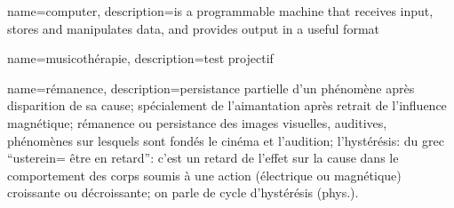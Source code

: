{
  name=computer,
  description={is a programmable machine that receives input,
               stores and manipulates data, and provides
               output in a useful format}
}

{
  name=musicothérapie,
  description={test projectif}
}



{
  name=rémanence,
  description={persistance partielle d'un phénomène après disparition
  de sa cause; spécialement de l'aimantation après retrait de
  l'influence magnétique; rémanence ou persistance des images
  visuelles, auditives, phénomènes sur lesquels sont fondés le cinéma
  et l'audition; l'hystérésis: du grec ``usterein= être en retard'':
  c'est un retard de l'effet sur la cause dans le comportement des
  corps soumis à une action (électrique ou magnétique) croissante ou
  décroissante; on parle de cycle d'hystérésis (phys.).}
}
